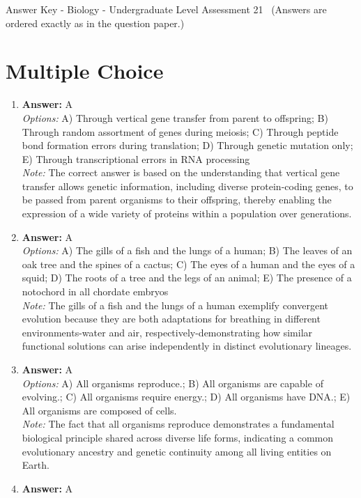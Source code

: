 \documentclass[12pt]{article}
\begin{document}
\begin{center}
Answer Key - Biology - Undergraduate Level Assessment 21 \
\small (Answers are ordered exactly as in the question paper.)
\end{center}

\section*{Multiple Choice}
\begin{enumerate}[label=\arabic*.]
\item \textbf{Answer:} A
\\ \textit{Options:} A) Through vertical gene transfer from parent to offspring; B) Through random assortment of genes during meiosis; C) Through peptide bond formation errors during translation; D) Through genetic mutation only; E) Through transcriptional errors in RNA processing
\\ \textit{Note:} The correct answer is based on the understanding that vertical gene transfer allows genetic information, including diverse protein-coding genes, to be passed from parent organisms to their offspring, thereby enabling the expression of a wide variety of proteins within a population over generations.
\item \textbf{Answer:} A
\\ \textit{Options:} A) The gills of a fish and the lungs of a human; B) The leaves of an oak tree and the spines of a cactus; C) The eyes of a human and the eyes of a squid; D) The roots of a tree and the legs of an animal; E) The presence of a notochord in all chordate embryos
\\ \textit{Note:} The gills of a fish and the lungs of a human exemplify convergent evolution because they are both adaptations for breathing in different environments-water and air, respectively-demonstrating how similar functional solutions can arise independently in distinct evolutionary lineages.
\item \textbf{Answer:} A
\\ \textit{Options:} A) All organisms reproduce.; B) All organisms are capable of evolving.; C) All organisms require energy.; D) All organisms have DNA.; E) All organisms are composed of cells.
\\ \textit{Note:} The fact that all organisms reproduce demonstrates a fundamental biological principle shared across diverse life forms, indicating a common evolutionary ancestry and genetic continuity among all living entities on Earth.
\item \textbf{Answer:} A

\end{enumerate}
\end{document}
